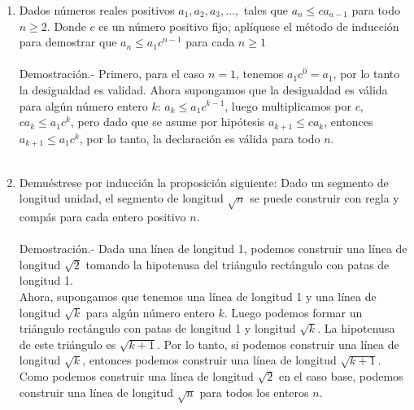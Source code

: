 \begin{enumerate}[\bfseries  1.]
\item Dados números reales positivos $a_1,a_2,a_3,...,$ tales que $a_n\leq ca_{a-1}$ para todo $n\geq 2$. Donde $c$ es un número positivo fijo, aplíquese el método de inducción para demostrar que $a_n \leq a_1 c^{n-1}$ para cada $n \geq 1$\\\\
Demostración.- \; Primero, para el caso $n=1$, tenemos $a_1c^0=a_1$, por lo tanto la desigualdad es validad. Ahora supongamos que la desigualdad es válida para algún número entero $k$: $a_k\leq a_1c^{k-1}$, luego multiplicamos por $c$, $ca_k\leq a_1c^k$, pero dado que se asume por hipótesis $a_{k+1} \leq ca_k$, entonces $a_{k+1}\leq a_1c^k$, por lo tanto, la declaración es válida para todo $n$.\\\\

\item Demuéstrese por inducción la proposición siguiente: Dado un segmento de longitud unidad, el segmento de longitud $\sqrt{n}$ se puede construir con regla y compás para cada entero positivo $n$.\\\\
Demostración.- \; Dada una línea de longitud 1, podemos construir una línea de longitud $\sqrt{2}$ tomando la hipotenusa del triángulo rectángulo con patas de longitud 1.\\
Ahora, supongamos que tenemos una línea de longitud 1 y una línea de longitud $\sqrt{k}$ para algún número entero $k$. Luego podemos formar un triángulo rectángulo con patas de longitud 1 y longitud $\sqrt{k}$. La hipotenusa de este triángulo es $\sqrt{k+1}$. Por lo tanto, si podemos construir una línea de longitud $\sqrt{k}$, entonces podemos construir una línea de longitud $\sqrt{k+1}$. Como podemos construir una línea de longitud $\sqrt{2}$ en el caso base, podemos construir una línea de longitud $\sqrt{n}$ para todos los enteros $n$.\\\\


\end{enumerate}
